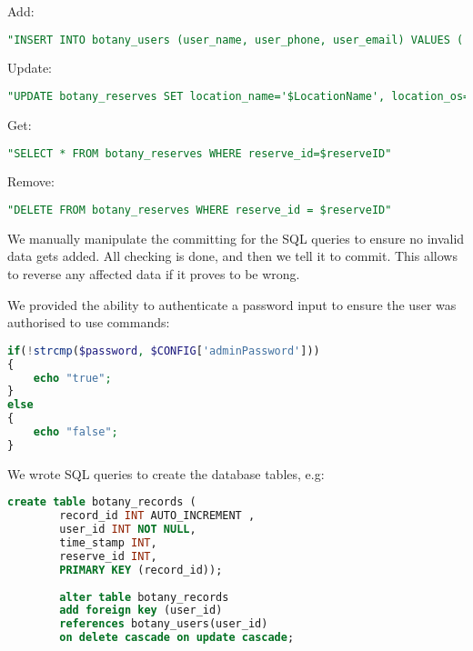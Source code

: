         Add:
        \begin{lstlisting}[language=sql]
"INSERT INTO botany_users (user_name, user_phone, user_email) VALUES ('$UserName', '$UserPhone', '$UserEmail')"
        \end{lstlisting}

        Update:
        \begin{lstlisting}[language=sql]
"UPDATE botany_reserves SET location_name='$LocationName', location_os='$LocationOS', description='$Description' WHERE reserve_id = $ReserveID"
        \end{lstlisting}
            
        Get:
        \begin{lstlisting}[language=sql]
"SELECT * FROM botany_reserves WHERE reserve_id=$reserveID"
        \end{lstlisting}
        
        Remove:
        \begin{lstlisting}[language=sql]
"DELETE FROM botany_reserves WHERE reserve_id = $reserveID"
        \end{lstlisting}

        We manually manipulate the committing for the SQL queries to ensure no invalid data gets added. All checking is done, and then we tell it to commit. This allows to reverse any affected data if it proves to be wrong.

        We provided the ability to authenticate a password input to ensure the user was authorised to use commands:
        \begin{lstlisting}[language=php]
if(!strcmp($password, $CONFIG['adminPassword']))    
{
    echo "true";
}
else
{
    echo "false";
}
        \end{lstlisting}
    
    We wrote SQL queries to create the database tables, e.g:
    \begin{lstlisting}[language=sql]
        create table botany_records ( 
        record_id INT AUTO_INCREMENT , 
        user_id INT NOT NULL, 
        time_stamp INT,
        reserve_id INT,
        PRIMARY KEY (record_id));
        
        alter table botany_records
        add foreign key (user_id)  
        references botany_users(user_id)  
        on delete cascade on update cascade;
    \end{lstlisting}

